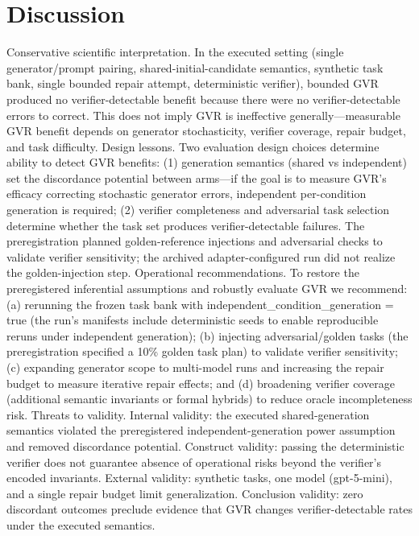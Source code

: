 \documentclass[conference]{IEEEtran}
\begin{document}
\section{Discussion}
Conservative scientific interpretation. In the executed setting (single generator/prompt pairing, shared-initial-candidate semantics, synthetic task bank, single bounded repair attempt, deterministic verifier), bounded GVR produced no verifier-detectable benefit because there were no verifier-detectable errors to correct. This does not imply GVR is ineffective generally---measurable GVR benefit depends on generator stochasticity, verifier coverage, repair budget, and task difficulty. Design lessons. Two evaluation design choices determine ability to detect GVR benefits: (1) generation semantics (shared vs independent) set the discordance potential between arms---if the goal is to measure GVR's efficacy correcting stochastic generator errors, independent per-condition generation is required; (2) verifier completeness and adversarial task selection determine whether the task set produces verifier-detectable failures. The preregistration planned golden-reference injections and adversarial checks to validate verifier sensitivity; the archived adapter-configured run did not realize the golden-injection step. Operational recommendations. To restore the preregistered inferential assumptions and robustly evaluate GVR we recommend: (a) rerunning the frozen task bank with independent\_condition\_generation = true (the run's manifests include deterministic seeds to enable reproducible reruns under independent generation); (b) injecting adversarial/golden tasks (the preregistration specified a 10\% golden task plan) to validate verifier sensitivity; (c) expanding generator scope to multi-model runs and increasing the repair budget to measure iterative repair effects; and (d) broadening verifier coverage (additional semantic invariants or formal hybrids) to reduce oracle incompleteness risk. Threats to validity. Internal validity: the executed shared-generation semantics violated the preregistered independent-generation power assumption and removed discordance potential. Construct validity: passing the deterministic verifier does not guarantee absence of operational risks beyond the verifier's encoded invariants. External validity: synthetic tasks, one model (gpt-5-mini), and a single repair budget limit generalization. Conclusion validity: zero discordant outcomes preclude evidence that GVR changes verifier-detectable rates under the executed semantics.
\end{document}
